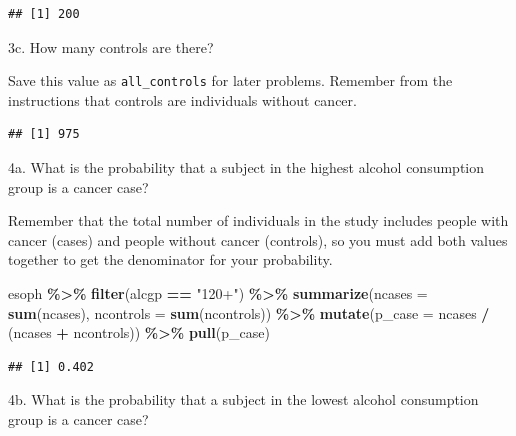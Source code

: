 \documentclass[
]{article}
\newenvironment{Shaded}{\begin{snugshade}}{\end{snugshade}}
\newcommand{\DataTypeTok}[1]{\textcolor[rgb]{0.13,0.29,0.53}{#1}}
\newcommand{\KeywordTok}[1]{\textcolor[rgb]{0.13,0.29,0.53}{\textbf{#1}}}
\newcommand{\NormalTok}[1]{#1}
\newcommand{\OperatorTok}[1]{\textcolor[rgb]{0.81,0.36,0.00}{\textbf{#1}}}
\newcommand{\StringTok}[1]{\textcolor[rgb]{0.31,0.60,0.02}{#1}}
\begin{document}
\begin{verbatim}
## [1] 200
\end{verbatim}

3c. How many controls are there?

Save this value as \texttt{all\_controls} for later problems. Remember
from the instructions that controls are individuals without cancer.

\begin{Shaded}
\end{Shaded}

\begin{verbatim}
## [1] 975
\end{verbatim}

4a. What is the probability that a subject in the highest alcohol
consumption group is a cancer case?

Remember that the total number of individuals in the study includes
people with cancer (cases) and people without cancer (controls), so you
must add both values together to get the denominator for your
probability.

\begin{Shaded}
\begin{Highlighting}[]
\NormalTok{esoph }\OperatorTok{\%\textgreater{}\%}
\StringTok{  }\KeywordTok{filter}\NormalTok{(alcgp }\OperatorTok{==}\StringTok{ "120+"}\NormalTok{) }\OperatorTok{\%\textgreater{}\%}
\StringTok{  }\KeywordTok{summarize}\NormalTok{(}\DataTypeTok{ncases =} \KeywordTok{sum}\NormalTok{(ncases), }\DataTypeTok{ncontrols =} \KeywordTok{sum}\NormalTok{(ncontrols)) }\OperatorTok{\%\textgreater{}\%}
\StringTok{  }\KeywordTok{mutate}\NormalTok{(}\DataTypeTok{p\_case =}\NormalTok{ ncases }\OperatorTok{/}\StringTok{ }\NormalTok{(ncases }\OperatorTok{+}\StringTok{ }\NormalTok{ncontrols)) }\OperatorTok{\%\textgreater{}\%}
\StringTok{  }\KeywordTok{pull}\NormalTok{(p\_case)}
\end{Highlighting}
\end{Shaded}

\begin{verbatim}
## [1] 0.402
\end{verbatim}

4b. What is the probability that a subject in the lowest alcohol
consumption group is a cancer case?
\end{document}
